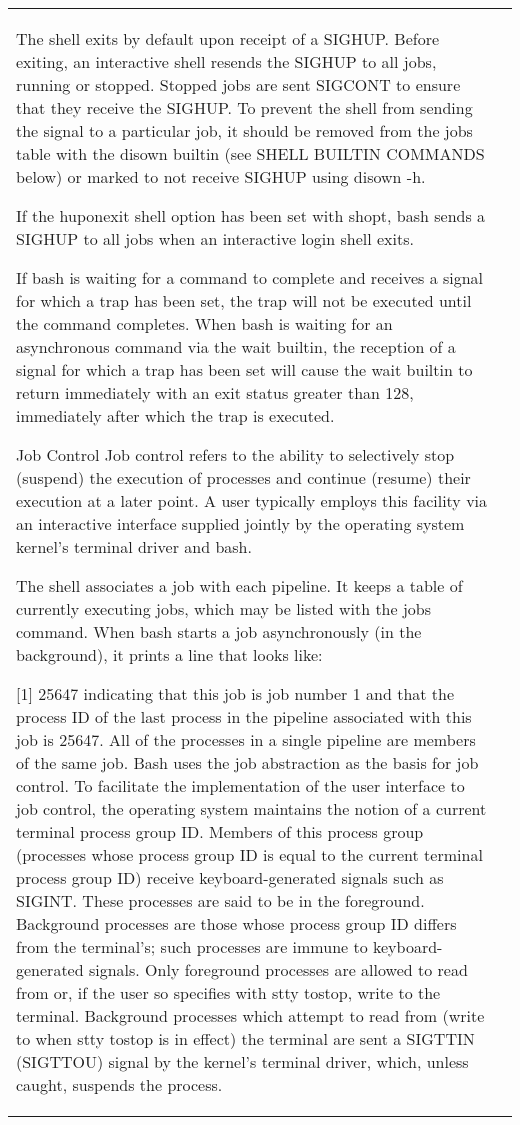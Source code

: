 \documentclass[11pt]{article}
\begin{document}
\begin{longtable}{p{}p{}}
{{{The shell exits by default upon receipt of a SIGHUP. Before exiting, an interactive shell resends the SIGHUP to all jobs, running or stopped. Stopped jobs are sent SIGCONT to ensure that they receive the SIGHUP. To prevent the shell from sending the signal to a particular job, it should be removed from the jobs table with the disown builtin (see SHELL BUILTIN COMMANDS below) or marked to not receive SIGHUP using disown -h.

If the huponexit shell option has been set with shopt, bash sends a SIGHUP to all jobs when an interactive login shell exits.

If bash is waiting for a command to complete and receives a signal for which a trap has been set, the trap will not be executed until the command completes. When bash is waiting for an asynchronous command via the wait builtin, the reception of a signal for which a trap has been set will cause the wait builtin to return immediately with an exit status greater than 128, immediately after which the trap is executed.

Job Control
Job control refers to the ability to selectively stop (suspend) the execution of processes and continue (resume) their execution at a later point. A user typically employs this facility via an interactive interface supplied jointly by the operating system kernel's terminal driver and bash.

The shell associates a job with each pipeline. It keeps a table of currently executing jobs, which may be listed with the jobs command. When bash starts a job asynchronously (in the background), it prints a line that looks like:

[1] 25647
indicating that this job is job number 1 and that the process ID of the last process in the pipeline associated with this job is 25647. All of the processes in a single pipeline are members of the same job. Bash uses the job abstraction as the basis for job control.
To facilitate the implementation of the user interface to job control, the operating system maintains the notion of a current terminal process group ID. Members of this process group (processes whose process group ID is equal to the current terminal process group ID) receive keyboard-generated signals such as SIGINT. These processes are said to be in the foreground. Background processes are those whose process group ID differs from the terminal's; such processes are immune to keyboard-generated signals. Only foreground processes are allowed to read from or, if the user so specifies with stty tostop, write to the terminal. Background processes which attempt to read from (write to when stty tostop is in effect) the terminal are sent a SIGTTIN (SIGTTOU) signal by the kernel's terminal driver, which, unless caught, suspends the process.

}}}
\end{longtable}
\end{document}
